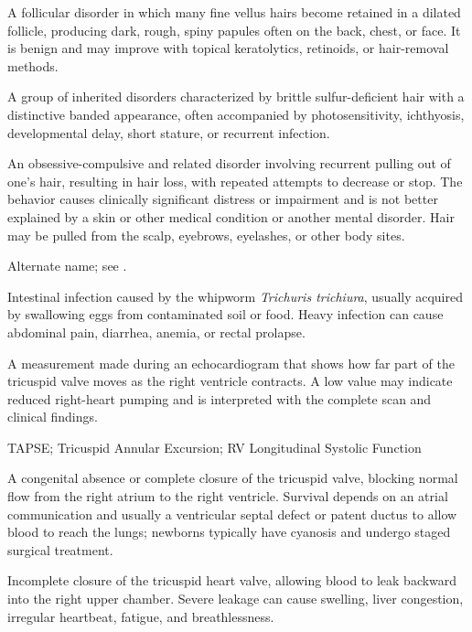  A follicular disorder in which many fine vellus hairs become retained in a dilated follicle, producing dark, rough, spiny papules often on the back, chest, or face. It is benign and may improve with topical keratolytics, retinoids, or hair-removal methods.

 A group of inherited disorders characterized by brittle sulfur-deficient hair with a
distinctive banded appearance, often accompanied by photosensitivity, ichthyosis,
developmental delay, short stature, or recurrent infection.

 An obsessive-compulsive and related disorder involving recurrent pulling out of one’s hair, resulting in hair loss, with repeated attempts to decrease or stop. The behavior causes clinically significant distress or impairment and is not better explained by a skin or other medical condition or another mental disorder. Hair may be pulled from the scalp, eyebrows, eyelashes, or other body sites.

 Alternate name; see .

 Intestinal infection caused by the whipworm \textit{Trichuris trichiura}, usually acquired by swallowing eggs from contaminated soil or food. Heavy infection can cause abdominal pain, diarrhea, anemia, or rectal prolapse.

 A measurement made during an echocardiogram that shows how far part of the tricuspid valve moves as the right ventricle contracts. A low value may indicate reduced right-heart pumping and is interpreted with the complete scan and clinical findings.

\synonyms
TAPSE; Tricuspid Annular Excursion; RV Longitudinal Systolic Function

 A congenital absence or complete closure of the tricuspid valve, blocking normal flow from the right atrium to the right ventricle. Survival depends on an atrial communication and usually a ventricular septal defect or patent ductus to allow blood to reach the lungs; newborns typically have cyanosis and undergo staged surgical treatment.

 Incomplete closure of the tricuspid heart valve, allowing blood to leak backward into the right upper chamber. Severe leakage can cause swelling, liver congestion, irregular heartbeat, fatigue, and breathlessness.

